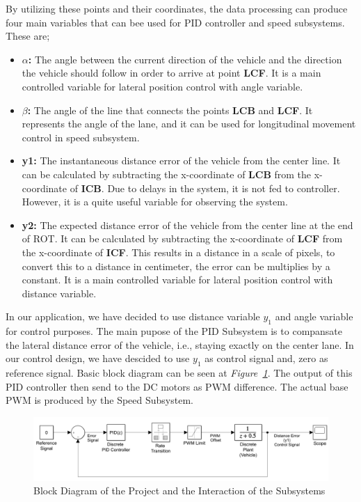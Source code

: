 \documentclass[a4paper,12pt]{article}
\begin{document}
\begin{enumerate}


	By utilizing these points and their coordinates, the data processing can produce four main variables that can bee used for PID controller and speed subsystems. These are;

	\begin{itemize}
		\item \textbf{$\alpha$:} The angle between the current direction of the vehicle and the direction the vehicle should follow in order to arrive at point \textbf{LCF}. It is a main controlled variable for lateral position control with angle variable.
		\item \textbf{$\beta$:} The angle of the line that connects the points \textbf{LCB} and \textbf{LCF}. It represents the angle of the lane, and it can be used for longitudinal movement control in speed subsystem.
		\item \textbf{y1:} The instantaneous distance error of the vehicle from the center line. It can be calculated by subtracting the x-coordinate of \textbf{LCB} from the x-coordinate of \textbf{ICB}. Due to delays in the system, it is not fed to controller. However, it is a quite useful variable for observing the system.  
		\item \textbf{y2:} The expected distance error of the vehicle from the center line at the end of ROT. It can be calculated by subtracting the x-coordinate of \textbf{LCF} from the x-coordinate of \textbf{ICF}. This results in a distance in a scale of pixels, to convert this to a distance in centimeter, the error can be multiplies by a constant. It is a main controlled variable for lateral position control with distance variable.
	\end{itemize}	 			



	In our application, we have decided to use distance variable $y_1$ and angle variable for control purposes. The main pupose of the PID Subsystem is to compansate the lateral distance error of the vehicle, i.e., staying exactly on the center lane. In our control design, we have descided to use $y_1$ as control signal and, zero as reference signal. Basic block diagram can be seen at \textit{Figure~\ref{fig:blockdiagram}}. The output of this PID controller then send to the DC motors as PWM difference. The actual base PWM is produced by the Speed Subsystem.
	
	
	\begin{figure}[h]
		\includegraphics[width=\textwidth,center]{images/Simulink/Block_Diagram}
		\caption{Block Diagram of the Project and the Interaction of the Subsystems}\label{fig:blockdiagram}
	\end{figure}




\end{enumerate}
\end{document}
